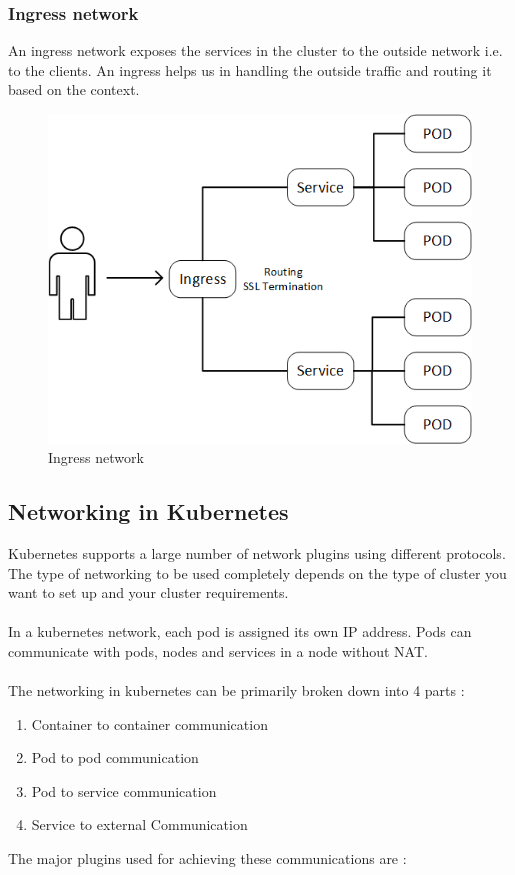 \documentclass[12pt]{report}
\begin{document}
\subsubsection{Ingress network}
An ingress network exposes the services in the cluster to the outside network i.e. to the clients. An ingress helps us in handling the outside traffic and routing it based on the context.\\
\begin{figure}[h!]
	\begin{center}
		\includegraphics[totalheight=0.31\textheight]{ingress}
		\caption{Ingress network \cite{Ingress}}
	\end{center}
\end{figure}
\subsection{Networking in Kubernetes}
Kubernetes supports a large number of network plugins using different protocols. The type of networking to be used completely depends on the type of cluster you want to set up and your cluster requirements.\\\\
In a kubernetes network, each pod is assigned its own IP address. Pods can communicate with pods, nodes and services in a node without NAT. \\\\
The networking in kubernetes can be primarily broken down into 4 parts :
\begin{enumerate}
	\item Container to container communication
	\item Pod to pod communication
	\item Pod to service communication
	\item Service to external Communication
\end{enumerate}
The major plugins used for achieving these communications are :
\end{document}
